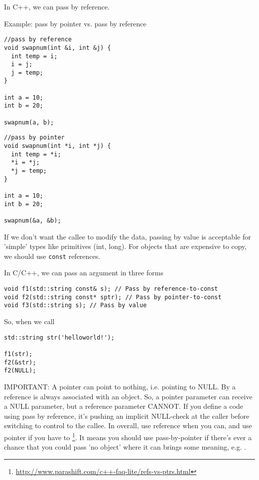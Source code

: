 In C++, we can pass by reference.

Example: pass by pointer vs. pass by reference

\begin{minipage}[t]{0.5\textwidth}
{\small \begin{verbatim}
//pass by reference
void swapnum(int &i, int &j) {
  int temp = i;
  i = j;
  j = temp;
}

int a = 10;
int b = 20;

swapnum(a, b);
\end{verbatim}}
\end{minipage}
\begin{minipage}[t]{0.5\textwidth}
{\small \begin{verbatim}
//pass by pointer
void swapnum(int *i, int *j) {
  int temp = *i;
  *i = *j;
  *j = temp;
}

int a = 10;
int b = 20;

swapnum(&a, &b);
\end{verbatim}}
\end{minipage}


If we don't want the callee to modify the data, passing by value is acceptable
for 'simple' types like primitives (int, long). For objects that are expensive
to copy, we should use \verb!const! references.

In C/C++, we can pass an argument in three forms
\begin{verbatim}
void f1(std::string const& s); // Pass by reference-to-const
void f2(std::string const* sptr); // Pass by pointer-to-const
void f3(std::string s); // Pass by value
\end{verbatim}
So, when we call
\begin{verbatim}
std::string str('helloworld!');

f1(str); 
f2(&str); 
f2(NULL);
\end{verbatim}

IMPORTANT: A pointer can point to nothing, i.e. pointing to NULL. By a reference
is always associated with an object. So, a pointer parameter can receive a NULL
parameter, but a reference parameter CANNOT. If you define a code using pass by
reference, it's pushing an implicit NULL-check at the caller before switching to
control to the callee. In overall, use reference when you can, and use pointer if you
have to
\footnote{\url{http://www.parashift.com/c++-faq-lite/refs-vs-ptrs.html}}. It
means you should use pass-by-pointer if there's ever a chance that you could 
pass 'no object' where it can brings some meaning, e.g. .

